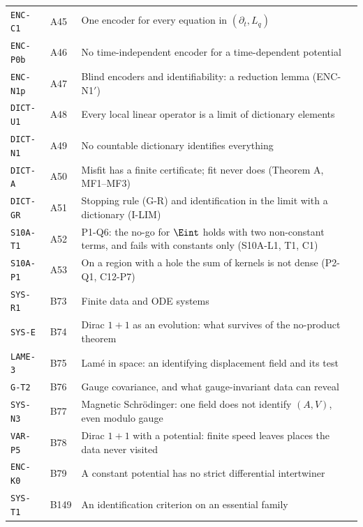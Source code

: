 \begin{center}
\begin{longtable}{@{}L{3.6cm}L{1.2cm}L{8.0cm}L{1.2cm}@{}}
\texttt{ENC-C1} & A45 & One encoder for every equation in $(\partial_t,L_q)$ & \pageref{dim:ENC-C1}\\
\texttt{ENC-P0b} & A46 & No time-independent encoder for a time-dependent potential & \pageref{dim:ENC-P0b}\\
\texttt{ENC-N1p} & A47 & Blind encoders and identifiability: a reduction lemma (ENC-N1$'$) & \pageref{dim:ENC-N1p}\\
\texttt{DICT-U1} & A48 & Every local linear operator is a limit of dictionary elements & \pageref{dim:DICT-U1}\\
\texttt{DICT-N1} & A49 & No countable dictionary identifies everything & \pageref{dim:DICT-N1}\\
\texttt{DICT-A} & A50 & Misfit has a finite certificate; fit never does (Theorem A, MF1--MF3) & \pageref{dim:DICT-A}\\
\texttt{DICT-GR} & A51 & Stopping rule (G-R) and identification in the limit with a dictionary (I-LIM) & \pageref{dim:DICT-GR}\\
\texttt{S10A-T1} & A52 & P1-Q6: the no-go for $\Eint$ holds with two non-constant terms, and fails with constants only (S10A-L1, T1, C1) & \pageref{dim:S10A-T1}\\
\texttt{S10A-P1} & A53 & On a region with a hole the sum of kernels is not dense (P2-Q1, C12-P7) & \pageref{dim:S10A-P1}\\
\texttt{SYS-R1} & B73 & Finite data and ODE systems & \pageref{dim:SYS-R1}\\
\texttt{SYS-E} & B74 & Dirac $1+1$ as an evolution: what survives of the no-product theorem & \pageref{dim:SYS-E}\\
\texttt{LAME-3} & B75 & Lam\'e in space: an identifying displacement field and its test & \pageref{dim:LAME-3}\\
\texttt{G-T2} & B76 & Gauge covariance, and what gauge-invariant data can reveal & \pageref{dim:G-T2}\\
\texttt{SYS-N3} & B77 & Magnetic Schr\"odinger: one field does not identify $(A,V)$, even modulo gauge & \pageref{dim:SYS-N3}\\
\texttt{VAR-P5} & B78 & Dirac $1+1$ with a potential: finite speed leaves places the data never visited & \pageref{dim:VAR-P5}\\
\texttt{ENC-K0} & B79 & A constant potential has no strict differential intertwiner & \pageref{dim:ENC-K0}\\
\texttt{SYS-T1} & B149 & An identification criterion on an essential family & \pageref{dim:SYS-T1}\\

\end{longtable}
\end{center}
